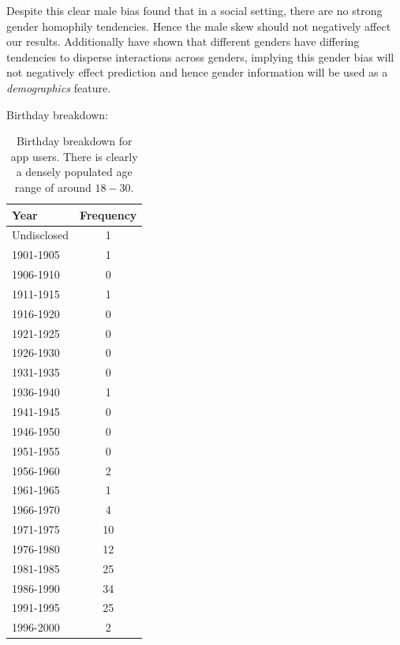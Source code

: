 Despite this clear male bias \cite{jugand} found that in a social setting, there are no strong gender homophily tendencies. Hence the male 
skew should not negatively affect our results. Additionally \cite{backstrom2011center} have shown that different genders have differing 
tendencies to disperse interactions across genders, implying this gender bias will not negatively effect prediction and hence gender information will 
be used as a \emph{demographics} feature.

\clearpage

Birthday breakdown:

\begin{table}[!htbp]
\centering
	\begin{tabular}{|l|c|} %
		\hline
		\textbf{Year} & \textbf{Frequency}  \\ \hline
		Undisclosed & 1 \\ \hline
		1901-1905 & 1 \\ \hline
		1906-1910 & 0 \\ \hline
		1911-1915 & 1 \\ \hline
		1916-1920 & 0 \\ \hline
		1921-1925 & 0 \\ \hline
		1926-1930 & 0 \\ \hline
		1931-1935 & 0 \\ \hline
		1936-1940 & 1 \\ \hline
		1941-1945 & 0 \\ \hline
		1946-1950 & 0 \\ \hline
		1951-1955 & 0 \\ \hline
		1956-1960 & 2 \\ \hline
		1961-1965 & 1 \\ \hline
		1966-1970 & 4 \\ \hline
		1971-1975 & 10 \\ \hline
		1976-1980 & 12 \\ \hline
		1981-1985 & 25 \\ \hline
		1986-1990 & 34 \\ \hline
		1991-1995 & 25 \\ \hline
		1996-2000 & 2 \\ \hline
	\end{tabular}
	\caption{Birthday breakdown for app users. There is clearly a densely populated age range of around $18 - 30$.}
	\label{tab:revpol}
\end{table}

